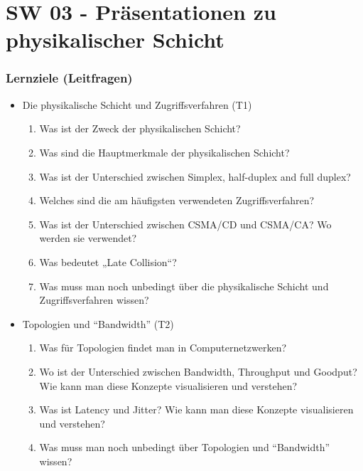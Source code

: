 \part{SW 03 - Präsentationen zu physikalischer Schicht}
\section{Lernziele (Leitfragen)}
\begin{itemize}
    \item Die physikalische Schicht und Zugriffsverfahren (T1)
    \begin{enumerate}
        \item Was ist der Zweck der physikalischen Schicht?
        \item Was sind die Hauptmerkmale der physikalischen Schicht?
        \item Was ist der Unterschied zwischen \flqq{}Simplex\frqq, \flqq{}half-duplex\frqq{} and \flqq{}full duplex\frqq?
        \item Welches sind die am häufigsten verwendeten Zugriffsverfahren?
        \item Was ist der Unterschied zwischen CSMA/CD und CSMA/CA? Wo werden sie verwendet?
        \item Was bedeutet „Late Collision“?
        \item Was muss man noch unbedingt über die physikalische Schicht und Zugriffsverfahren wissen?\\
    \end{enumerate}

    \item Topologien und ``Bandwidth'' (T2)
    \begin{enumerate}
        \item Was für Topologien findet man in Computernetzwerken?
        \item Wo ist der Unterschied zwischen \flqq{}Bandwidth\frqq, \flqq{}Throughput\frqq{} und \flqq{}Goodput\frqq? Wie kann man diese Konzepte visualisieren und verstehen?
        \item Was ist \flqq{}Latency\frqq{} und \flqq{}Jitter\frqq? Wie kann man diese Konzepte visualisieren und verstehen?
        \item Was muss man noch unbedingt über Topologien und ``Bandwidth'' wissen?\\
    \end{enumerate}


\end{itemize}
